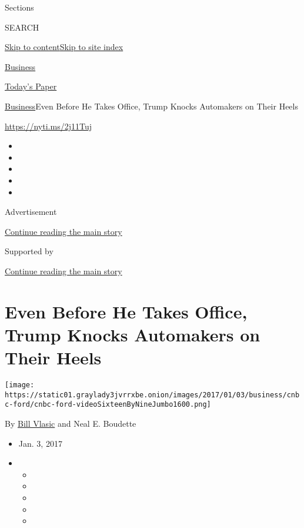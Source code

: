 Sections

SEARCH

\protect\hyperlink{site-content}{Skip to
content}\protect\hyperlink{site-index}{Skip to site index}

\href{https://www.nytimes3xbfgragh.onion/section/business}{Business}

\href{https://myaccount.nytimes3xbfgragh.onion/auth/login?response_type=cookie\&client_id=vi}{}

\href{https://www.nytimes3xbfgragh.onion/section/todayspaper}{Today's
Paper}

\href{/section/business}{Business}\textbar{}Even Before He Takes Office,
Trump Knocks Automakers on Their Heels

\url{https://nyti.ms/2j11Tuj}

\begin{itemize}
\item
\item
\item
\item
\item
\end{itemize}

Advertisement

\protect\hyperlink{after-top}{Continue reading the main story}

Supported by

\protect\hyperlink{after-sponsor}{Continue reading the main story}

\hypertarget{even-before-he-takes-office-trump-knocks-automakers-on-their-heels}{%
\section{Even Before He Takes Office, Trump Knocks Automakers on Their
Heels}\label{even-before-he-takes-office-trump-knocks-automakers-on-their-heels}}

\texttt{[image: https://static01.graylady3jvrrxbe.onion/images/2017/01/03/business/cnbc-ford/cnbc-ford-videoSixteenByNineJumbo1600.png]}

By \href{http://www.nytimes3xbfgragh.onion/by/bill-vlasic}{Bill Vlasic}
and Neal E. Boudette

\begin{itemize}
\item
  Jan. 3, 2017
\item
  \begin{itemize}
  \item
  \item
  \item
  \item
  \item
  \end{itemize}
\end{itemize}

